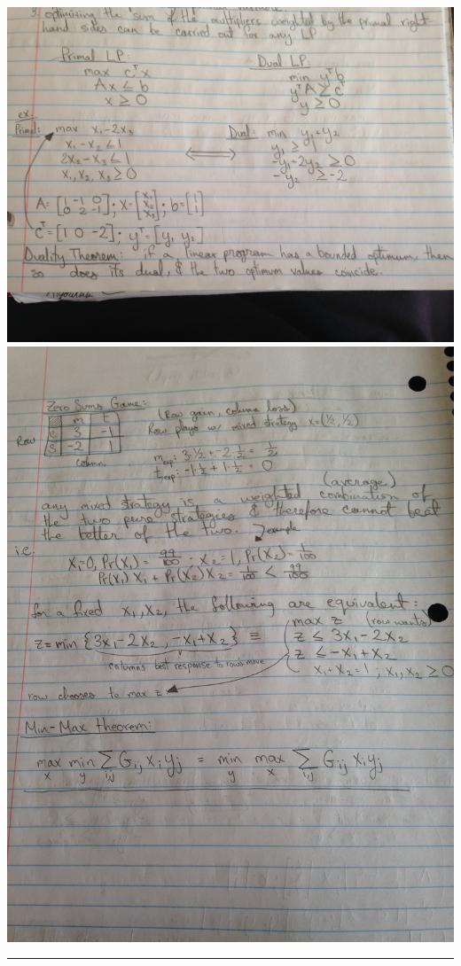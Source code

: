 \documentclass[10pt,landscape]{article}
\begin{document}
\begin{multicols}{3}
\includegraphics[scale=.115]{dual.jpeg}
\includegraphics[scale=.115]{zero.jpg}




\rule{0.3\linewidth}{0.25pt}
\scriptsize


\end{multicols}
\end{document}
